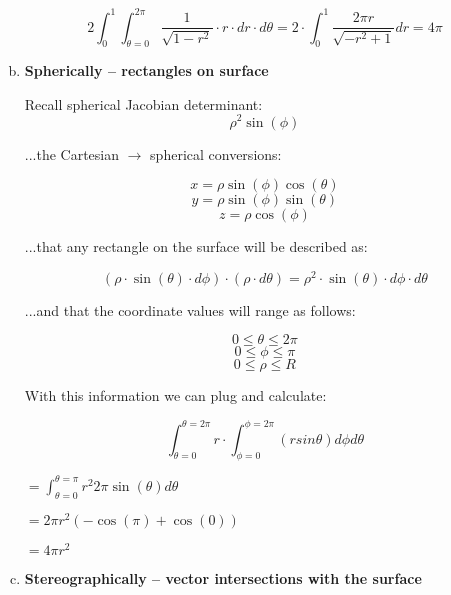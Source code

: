 \documentclass{article}
\begin{document}
\begin{enumerate}[a.]
            \[ 2\int_{0}^{1}\int_{\theta=0}^{2\pi} \frac{1}{\sqrt{1-r^2}}\cdot r \cdot dr \cdot d\theta = 2\cdot \int _0^1\frac{2\pi r}{\sqrt{-r^2+1}}dr = 4\pi \]

	\item \textbf{Spherically -- rectangles on surface}

            Recall spherical Jacobian determinant: \[ \rho^2\sin(\phi) \]

            ...the Cartesian $\rightarrow$ spherical conversions:

            \[ x = \rho\sin(\phi)\cos(\theta)   \]
            \[ y = \rho\sin(\phi)\sin(\theta)  \]
            \[ z = \rho\cos(\phi)  \]

            ...that any rectangle on the surface will be described as:

            \[ (\rho\cdot\sin(\theta)\cdot d \phi)\cdot(\rho\cdot d \theta) = \rho^2\cdot\sin(\theta)\cdot d\phi\cdot d\theta \]

            ...and that the coordinate values will range as follows:

            \[ 0 \leq \theta \leq 2\pi  \]
            \[ 0 \leq \phi \leq \pi  \]
            \[ 0 \leq \rho \leq R \]

            With this information we can plug and calculate:

            \[ \int_{\theta=0}^{\theta=2\pi}r\cdot\int_{\phi=0}^{\phi=2\pi} (r sin \theta) d\phi d\theta \]

            $= \int_{\theta=0}^{\theta=\pi}r^2 2\pi \sin(\theta)d\theta $

            $=  2\pi r^2 (-\cos(\pi)+\cos(0)) $

            $= 4\pi r^2$

	\item \textbf{Stereographically -- vector intersections with the surface}
\end{enumerate}
\end{document}
